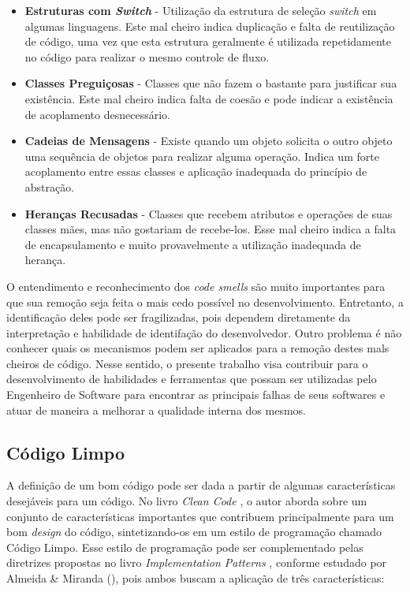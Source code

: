 \begin{itemize}
\item \textbf{Estruturas com \emph{Switch}} - Utilização da estrutura de seleção \emph{switch} em algumas linguagens. Este mal cheiro indica duplicação e falta de reutilização de código, uma vez que esta estrutura geralmente é utilizada repetidamente no código para realizar o mesmo controle de fluxo.

\item \textbf{Classes Preguiçosas} - Classes que não fazem o bastante para justificar sua existência. Este mal cheiro indica falta de coesão e pode indicar a existência de acoplamento desnecessário.

\item \textbf{Cadeias de Mensagens} - Existe quando um objeto solicita o outro objeto uma sequência de objetos para realizar alguma operação. Indica um forte acoplamento entre essas classes e aplicação inadequada do princípio de abstração.

\item \textbf{Heranças Recusadas} - Classes que recebem atributos e operações de suas classes mães, mas não gostariam de recebe-los. Esse mal cheiro indica a falta de encapsulamento e muito provavelmente a utilização inadequada de herança.
\end{itemize}

O entendimento e reconhecimento dos \emph{code smells} são muito importantes para que sua remoção seja feita o mais cedo possível no desenvolvimento. Entretanto, a identificação deles pode ser fragilizadas, pois dependem diretamente da interpretação e habilidade de identifação do desenvolvedor. Outro problema é não conhecer quais os mecanismos podem ser aplicados para a remoção destes mals cheiros de código. Nesse sentido, o presente trabalho visa contribuir para o desenvolvimento de habilidades e ferramentas que possam ser utilizadas pelo Engenheiro de Software para encontrar as principais falhas de seus softwares e atuar de maneira a melhorar a qualidade interna dos mesmos.

\subsection{Código Limpo}
\label{sec-clean-code}

A definição de um bom código pode ser dada a partir de algumas características desejáveis para um código. No livro \emph{Clean Code} \cite{martin2008}, o autor aborda sobre um conjunto de características importantes que contribuem principalmente para um bom \emph{design} do código, sintetizando-os em um estilo de programação chamado Código Limpo. Esse estilo de programação pode ser complementado pelas diretrizes propostas no livro \emph{Implementation Patterns} \cite{beck2007}, conforme estudado por Almeida \& Miranda (\citeyear{almeida2010}), pois ambos buscam a aplicação de três características:

